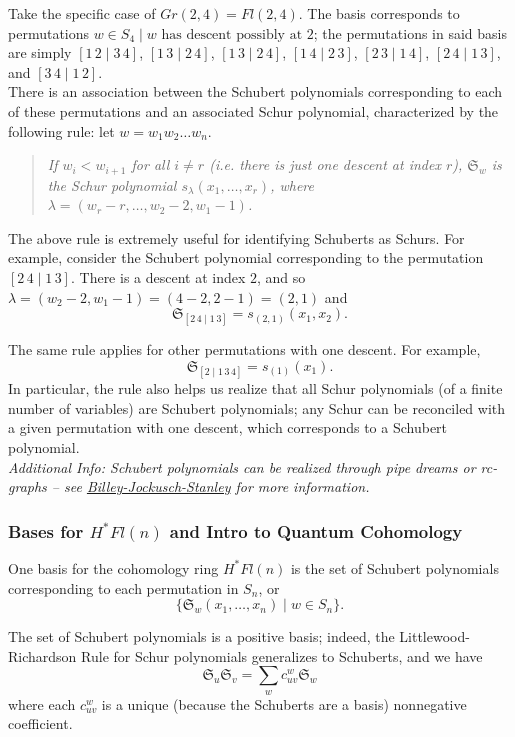 Take the specific case of $Gr(2, 4) = Fl(2, 4)$. The basis corresponds to permutations 
$w \in S_4 \mid w \text{ has descent possibly at $2$}$; the permutations in said basis are simply $[1\, 2 \mid 3 \,4]$, $[1\,3 \mid 2\,4]$, $[1\, 3 \mid 2\,4]$, $[1\,4 \mid 2\,3]$, $[2\,3 \mid 1\,4]$, $[2\,4 \mid 1\,3]$, and $[3\,4 \mid 1\,2]$. \\

There is an association between the Schubert polynomials corresponding to each of these permutations and an associated Schur polynomial, characterized by the following rule: let $w = w_1 w_2 \dots w_n$. 
\begin{quote}
\textit{If $w_i < w_{i+1}$ for all $i \neq r$ (i.e. there is just one descent at index $r$), $\mathfrak{S}_w$ is the Schur polynomial $s_\lambda(x_1, \dots, x_r)$, where $\lambda = (w_r - r, \dots, w_2 - 2, w_1 - 1)$.}
\end{quote}

The above rule is extremely useful for identifying Schuberts as Schurs. For example, consider the Schubert polynomial corresponding to the permutation $[2\,4 \mid 1\,3]$. There is a descent at index $2$, and so $\lambda = (w_2 - 2, w_1 - 1) = (4 - 2, 2 - 1) = (2, 1)$ and
\[
    \mathfrak{S}_{[2\,4 \mid 1\,3]} = s_{(2, 1)}(x_1, x_2).
\]

The same rule applies for other permutations with one descent. For example, 
\[
    \mathfrak{S}_{[2 \mid 1\,3\,4]} = s_{(1)}(x_1).
\]
In particular, the rule also helps us realize that all Schur polynomials (of a finite number of variables) are Schubert polynomials; any Schur can be reconciled with a given permutation with one descent, which corresponds to a Schubert polynomial. \\

\textit{Additional Info: Schubert polynomials can be realized through pipe dreams or rc-graphs -- see \href{https://sites.math.washington.edu/~billey/papers/bjs.pdf}{Billey-Jockusch-Stanley} for more information.}

\subsubsection{Bases for $H^* Fl(n)$ and Intro to Quantum Cohomology}

One basis for the cohomology ring $H^* Fl(n)$ is the set of Schubert polynomials corresponding to each permutation in $S_n$, or
\[
    \{ \mathfrak{S}_w(x_1, \dots, x_n) \mid w \in S_n \}.
\]

The set of Schubert polynomials is a positive basis; indeed, the Littlewood-Richardson Rule for Schur polynomials generalizes to Schuberts, and we have
\[
    \mathfrak{S}_u \mathfrak{S}_v = \sum_{w} c_{uv}^w \mathfrak{S}_w
\]
where each $c_{uv}^w$ is a unique (because the Schuberts are a basis) nonnegative coefficient. \\


